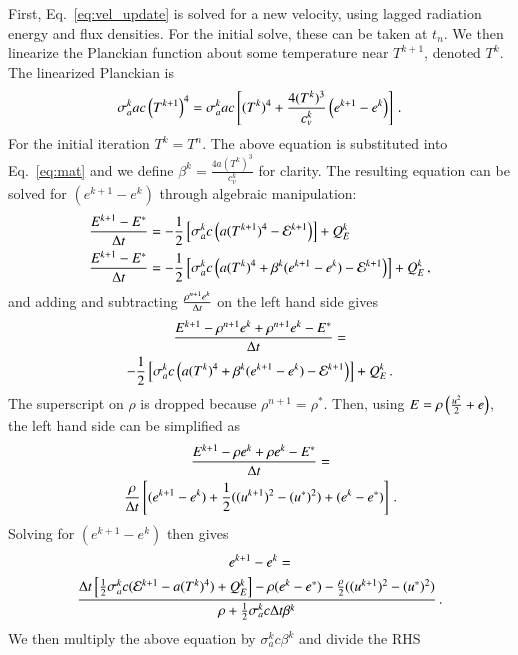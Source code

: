 First, Eq.~\eqref{eq:vel_update} is solved for a new velocity, using lagged
radiation energy and flux densities.  For the initial solve, these can be taken
at $t_n$.  We then linearize the Planckian function about some temperature near
$T^{k+1}$, denoted $T^k$. The linearized Planckian is
\begin{equation}
  \sigma_a^k a c \left( T^{k+1} \right)^4 = 
  \sigma_a^k a c \left[(T^k)^4 + \frac{4(T^k)^3}{c_v^k}\left(
  e^{k+1} - e^{k}  \right)\right] \, .
    \label{eq:linearize}
\end{equation}
For the initial iteration $T^k=T^n$.  The above equation is substituted into
Eq.~\eqref{eq:mat} and we define $\beta^k=\frac{4a(T^k)^3}{c_v^k}$ for clarity.
The resulting equation can be solved for $(e^{k+1} - e^{k})$ through
algebraic manipulation:
\begin{align*}
   \frac{E^{k+1} - E^*}{\Delta t} &= - \frac{1}{2}\left[\sigma_a^k c \left(
   a(T^{k+1})^4 - \mathcal{E}^{k+1}\right)\right]+Q_E^k \\
   \frac{E^{k+1} - E^*}{\Delta t} &= - \frac{1}{2}\left[\sigma_a^k c \left(
   a(T^k)^4 + \beta^k(e^{k+1} - e^k)  - \mathcal{E}^{k+1}\right)\right]+Q_E^k \, ,
\end{align*}
and adding and subtracting $\frac{\rho^{n+1}e^k}{\Delta t}$ on the left hand side gives
\begin{multline*}
   \frac{E^{k+1}-\rho^{n+1} e^k + \rho^{n+1} e^k - E^*}{\Delta t} = \\
   -\frac{1}{2}\left[\sigma_a^{k}c\left(
   a(T^k)^4 + \beta^k(e^{k+1} - e^k)  - \mathcal{E}^{k+1}\right)\right]+Q_E^k \, .
\end{multline*}
The superscript on $\rho$ is dropped because $\rho^{n+1} = \rho^*$. Then, using
$E=\rho\left( \frac{u^2}{2} + e \right)$, the left hand side can be simplified as 
\begin{multline} 
   \frac{E^{k+1} - \rho e^k + \rho e^k - E^*}{\Delta t} =\\
   \frac{\rho}{\Delta t}\left[(e^{k+1} - e^{k}) + \frac{1}{2}((u^{k+1})^2-(u^*)^2) +
   (e^k-e^*) \right] \, .
\end{multline}
Solving for $(e^{k+1} - e^{k})$ then gives
\begin{multline}
    e^{k+1}-e^k=\\
    \frac{{\Delta t}\left[ \frac{1}{2}\sigma_a^k c (\mathcal{E}^{k+1} -
    a(T^k)^4)+Q_E^k \right]- \rho(e^k-e^*)-
    \frac{\rho}{2}((u^{k+1})^2-(u^*)^2)}
    {\rho +\frac{1}{2}\sigma_a^k c \Delta t\beta^k} \, .
\label{eq:energy_update}
\end{multline}
We then multiply the above equation by $\sigma_a^k c \beta^k$ and divide the RHS
